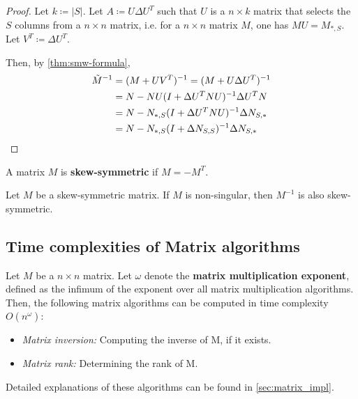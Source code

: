 \begin{proof}
    Let \(k \coloneqq |S|\). 
    Let \(A \coloneqq U \Delta U^T\) such that \(U\) is a \(n \times k\) matrix that selects the \(S\) columns from a \(n \times n\) matrix, i.e.
    for a \(n \times n\) matrix \(M\), one has \(MU = M_{*, S}\). Let \(V^T \coloneqq \Delta U^T\).

    Then, by \cref{thm:smw-formula}, 
    \begin{align*}
        \tilde{M}^{-1} &= (M + U V^T)^{-1} = (M + U \Delta U^T)^{-1} \\
        &= N - N U (I + \Delta U^T N U)^{-1} \Delta U^T N \\
        &= N - N_{*, S} (I + \Delta U^T N U)^{-1} \Delta N_{S, *} \\
        &= N - N_{*, S} (I + \Delta N_{S, S})^{-1} \Delta N_{S, *} \qedhere
    \end{align*}
\end{proof}

\begin{definition}
\label{def:skew}
    A matrix \(M\) is \textbf{skew-symmetric} if \(M = -M^{T}\).
\end{definition}

\begin{fact}
    Let \(M\) be a skew-symmetric matrix.
    If \(M\) is non-singular, then \(M^{-1}\) is also skew-symmetric.
\end{fact}

\subsection{Time complexities of Matrix algorithms}
\label{matrix:time_complexity}
Let \(M\) be a \(n \times n\) matrix. 
Let \(\omega\) denote the \textbf{matrix multiplication exponent}, defined as the infimum of the exponent over all matrix multiplication algorithms. 
Then, the following matrix algorithms can be computed in time complexity \(O(n^\omega)\):
\begin{itemize}
    \item \textit{Matrix inversion:} Computing the inverse of M, if it exists.
    \item \textit{Matrix rank:} Determining the rank of M.
\end{itemize}
Detailed explanations of these algorithms can be found in \cref{sec:matrix_impl}.